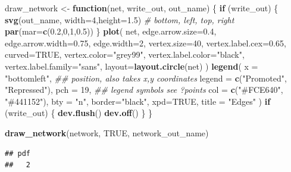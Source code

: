 \documentclass[
]{book}
\newenvironment{Shaded}{\begin{snugshade}}{\end{snugshade}}
\newcommand{\CommentTok}[1]{\textcolor[rgb]{0.56,0.35,0.01}{\textit{#1}}}
\newcommand{\ControlFlowTok}[1]{\textcolor[rgb]{0.13,0.29,0.53}{\textbf{#1}}}
\newcommand{\DataTypeTok}[1]{\textcolor[rgb]{0.13,0.29,0.53}{#1}}
\newcommand{\DecValTok}[1]{\textcolor[rgb]{0.00,0.00,0.81}{#1}}
\newcommand{\FloatTok}[1]{\textcolor[rgb]{0.00,0.00,0.81}{#1}}
\newcommand{\KeywordTok}[1]{\textcolor[rgb]{0.13,0.29,0.53}{\textbf{#1}}}
\newcommand{\NormalTok}[1]{#1}
\newcommand{\OtherTok}[1]{\textcolor[rgb]{0.56,0.35,0.01}{#1}}
\newcommand{\StringTok}[1]{\textcolor[rgb]{0.31,0.60,0.02}{#1}}
\begin{document}
\begin{Shaded}
\begin{Highlighting}[]
\NormalTok{draw\_network \textless{}{-}}\StringTok{ }\ControlFlowTok{function}\NormalTok{(net, write\_out, out\_name) \{}
  \ControlFlowTok{if}\NormalTok{ (write\_out) \{}
    \KeywordTok{svg}\NormalTok{(out\_name, }\DataTypeTok{width=}\DecValTok{4}\NormalTok{,}\DataTypeTok{height=}\FloatTok{1.5}\NormalTok{)}
    \CommentTok{\# bottom, left, top, right}
    \KeywordTok{par}\NormalTok{(}\DataTypeTok{mar=}\KeywordTok{c}\NormalTok{(}\FloatTok{0.2}\NormalTok{,}\DecValTok{0}\NormalTok{,}\DecValTok{1}\NormalTok{,}\FloatTok{0.5}\NormalTok{))}
\NormalTok{  \}}
  \KeywordTok{plot}\NormalTok{(}
\NormalTok{    net,}
    \DataTypeTok{edge.arrow.size=}\FloatTok{0.4}\NormalTok{,}
    \DataTypeTok{edge.arrow.width=}\FloatTok{0.75}\NormalTok{,}
    \DataTypeTok{edge.width=}\DecValTok{2}\NormalTok{,}
    \DataTypeTok{vertex.size=}\DecValTok{40}\NormalTok{,}
    \DataTypeTok{vertex.label.cex=}\FloatTok{0.65}\NormalTok{,}
    \DataTypeTok{curved=}\OtherTok{TRUE}\NormalTok{,}
    \DataTypeTok{vertex.color=}\StringTok{"grey99"}\NormalTok{,}
    \DataTypeTok{vertex.label.color=}\StringTok{"black"}\NormalTok{,}
    \DataTypeTok{vertex.label.family=}\StringTok{"sans"}\NormalTok{,}
    \DataTypeTok{layout=}\KeywordTok{layout.circle}\NormalTok{(net)}
\NormalTok{  )}
  \KeywordTok{legend}\NormalTok{(}
    \DataTypeTok{x =} \StringTok{"bottomleft"}\NormalTok{,      }\CommentTok{\#\# position, also takes x,y coordinates}
    \DataTypeTok{legend =} \KeywordTok{c}\NormalTok{(}\StringTok{"Promoted"}\NormalTok{, }\StringTok{"Repressed"}\NormalTok{),}
    \DataTypeTok{pch =} \DecValTok{19}\NormalTok{,              }\CommentTok{\#\# legend symbols see ?points}
    \DataTypeTok{col =} \KeywordTok{c}\NormalTok{(}\StringTok{"\#FCE640"}\NormalTok{, }\StringTok{"\#441152"}\NormalTok{),}
    \DataTypeTok{bty =} \StringTok{"n"}\NormalTok{,}
    \DataTypeTok{border=}\StringTok{"black"}\NormalTok{,}
    \DataTypeTok{xpd=}\OtherTok{TRUE}\NormalTok{,}
    \DataTypeTok{title =} \StringTok{"Edges"}
\NormalTok{  )}
  \ControlFlowTok{if}\NormalTok{ (write\_out) \{}
    \KeywordTok{dev.flush}\NormalTok{()}
    \KeywordTok{dev.off}\NormalTok{()}
\NormalTok{  \}}
\NormalTok{\}}

\KeywordTok{draw\_network}\NormalTok{(network, }\OtherTok{TRUE}\NormalTok{, network\_out\_name)}
\end{Highlighting}
\end{Shaded}

\begin{verbatim}
## pdf 
##   2
\end{verbatim}
\end{document}
